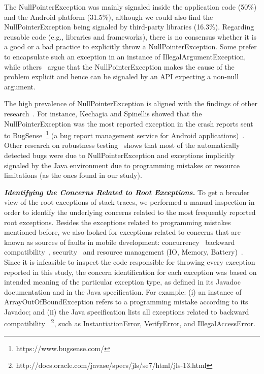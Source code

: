  The NullPointerException was mainly signaled inside the application code (50\%) and the Android platform (31.5\%),
 although we could also find the NullPointerException being signaled by third-party libraries (16.3\%).
Regarding reusable code (e.g., libraries and frameworks), there is no consensus whether it is a good or a bad practice to
explicitly throw a NullPointerException. Some prefer to encapsulate such an exception in
an instance of IllegalArgumentException, while others~\cite{bloch2008effective} argue that the
NullPointerException makes the cause of the problem explicit and hence
can be signaled by an API expecting a non-null argument.

The high prevalence of NullPointerException is aligned with the
findings of other
research~\cite{kim2013predicting,fraser20131600,csallner2004jcrasher,kechagia2014}.
For instance, Kechagia and Spinellis showed that the NullPointerException was the
most reported exception in the crash reports sent to BugSense~\footnote{https://www.bugsense.com/} (a bug report
management service for Android applications)~\cite{kechagia2014}.
Other research on robustness testing~\cite{maji2012empirical,csallner2004jcrasher} shows that most of the automatically
detected bugs were due to NullPointerException and exceptions
implicitly signaled by the Java
environment due to programming mistakes or resource limitations
 (as the ones found in our study).


\emph{\textbf{Identifying the Concerns Related to Root Exceptions.}} To get a broader view of the root exceptions of stack traces,
we performed a manual inspection in order to identify the underlying
concerns related to the most frequently reported root exceptions.
Besides the exceptions related to programming mistakes mentioned before, we also looked for exceptions related to concerns that are known as sources of faults in mobile development: concurrency~\cite{ama2012} backward compatibility~\cite{McDon13}, security~\cite{enck2011study,was2010} and resource management (IO, Memory, Battery)~\cite{Zhang12}. Since it is infeasible to inspect the code responsible for throwing every exception reported in this study,
the concern identification for each exception was based on intended
meaning of the particular exception type, as defined in
its Javadoc documentation and in the Java specification.
For example: (i) an instance of ArrayOutOfBoundException
refers to a programming mistake according to its Javadoc; and (ii) the Java specification lists all
exceptions related to backward compatibility
~\footnote{http://docs.oracle.com/javase/specs/jls/se7/html/jls-13.html}, such as
InstantiationError, VerifyError, and IllegalAccessError.


